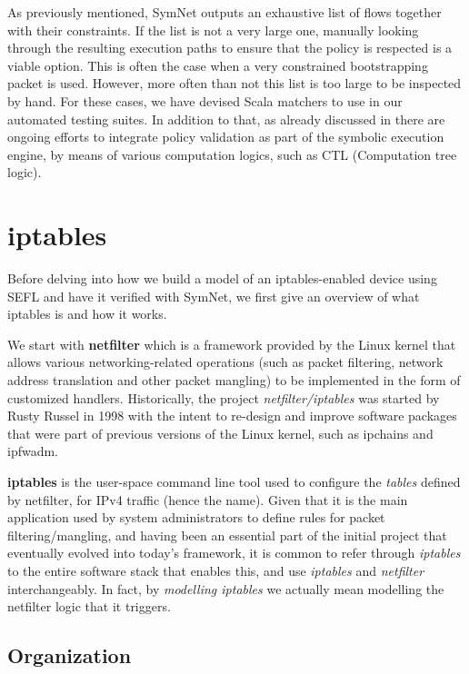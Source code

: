 As previously mentioned, SymNet outputs an exhaustive list of flows together
with their constraints.  If the list is not a very large one, manually looking
through the resulting execution paths to ensure that the policy is respected is
a viable option.  This is often the case when a very constrained bootstrapping
packet is used.  However, more often than not this list is too large to be
inspected by hand.  For these cases, we have devised Scala matchers to use in
our automated testing suites.  In addition to that, as already discussed in
 there are ongoing efforts to
integrate policy validation as part of the symbolic execution engine, by means
of various computation logics, such as CTL (Computation tree
logic).


\section{iptables}

Before delving into how we build a model of an iptables-enabled device using
SEFL and have it verified with SymNet, we first give an overview of what
iptables is and how it works.

We start with \textbf{netfilter} which is a framework provided by the Linux
kernel that allows various networking-related operations (such as packet
filtering, network address translation and other packet mangling) to be
implemented in the form of customized handlers.  Historically, the project
\emph{netfilter/iptables} was started by Rusty Russel in 1998 with the intent
to re-design and improve software packages that were part of previous versions
of the Linux kernel, such as ipchains and ipfwadm.

\textbf{iptables} is the user-space command line tool used to configure the
\emph{tables} defined by netfilter, for IPv4 traffic (hence the name). Given
that it is the main application used by system administrators to define rules
for packet filtering/mangling, and having been an essential part of the initial
project that eventually evolved into today's framework, it is common to refer
through \emph{iptables} to the entire software stack that enables this, and use
\emph{iptables} and \emph{netfilter} interchangeably.  In fact, by
\emph{modelling iptables} we actually mean modelling the netfilter logic that
it triggers.


\subsection{Organization}


